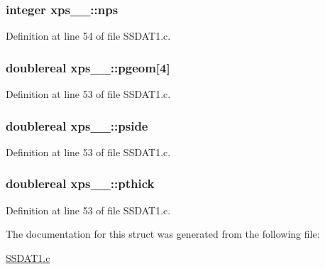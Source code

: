 \subsubsection[{\texorpdfstring{nps}{nps}}]{\setlength{\rightskip}{0pt plus 5cm}integer xps\+\_\+\_\+\+::nps}\hypertarget{structxps__1___a4be73b17200df038f2e05a151ed9f73c}{}\label{structxps__1___a4be73b17200df038f2e05a151ed9f73c}


Definition at line 54 of file S\+S\+D\+A\+T1.\+c.

\subsubsection[{\texorpdfstring{pgeom}{pgeom}}]{\setlength{\rightskip}{0pt plus 5cm}doublereal xps\+\_\+\_\+\+::pgeom\mbox{[}4\mbox{]}}\hypertarget{structxps__1___a0080855d73d61551eaf14cce3ffa64ed}{}\label{structxps__1___a0080855d73d61551eaf14cce3ffa64ed}


Definition at line 53 of file S\+S\+D\+A\+T1.\+c.

\subsubsection[{\texorpdfstring{pside}{pside}}]{\setlength{\rightskip}{0pt plus 5cm}doublereal xps\+\_\+\_\+\+::pside}\hypertarget{structxps__1___a60dd9c649d3821fc90a07d7620f044f9}{}\label{structxps__1___a60dd9c649d3821fc90a07d7620f044f9}


Definition at line 53 of file S\+S\+D\+A\+T1.\+c.

\subsubsection[{\texorpdfstring{pthick}{pthick}}]{\setlength{\rightskip}{0pt plus 5cm}doublereal xps\+\_\+\_\+\+::pthick}\hypertarget{structxps__1___a60e15bd24df26974e2995e4963e28b47}{}\label{structxps__1___a60e15bd24df26974e2995e4963e28b47}


Definition at line 53 of file S\+S\+D\+A\+T1.\+c.



The documentation for this struct was generated from the following file\+:\begin{DoxyCompactItemize}
\item 
\hyperlink{SSDAT1_8c}{S\+S\+D\+A\+T1.\+c}\end{DoxyCompactItemize}
